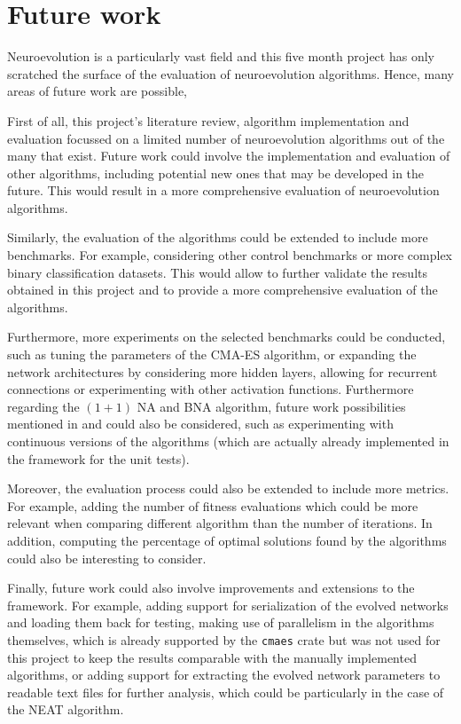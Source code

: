 \chapter{Future work}


Neuroevolution is a particularly vast field and this five month project has only scratched the surface of the evaluation of neuroevolution algorithms. Hence, many areas of future work are possible,

First of all, this project's literature review, algorithm implementation and evaluation focussed on a limited number of neuroevolution algorithms out of the many that exist. Future work could involve
the implementation and evaluation of other algorithms, including potential new ones that may be developed in the future. This would result in a more comprehensive evaluation of neuroevolution algorithms.

Similarly, the evaluation of the algorithms could be extended to include more benchmarks. For example, considering other control benchmarks or more complex binary classification datasets.
This would allow to further validate the results obtained in this project and to provide a more comprehensive evaluation of the algorithms.

Furthermore, more experiments on the selected benchmarks could be conducted, such as tuning the parameters of the CMA-ES algorithm, or expanding the network architectures by considering more
hidden layers, allowing for recurrent connections or experimenting with other activation functions. Furthermore regarding the $(1 + 1)$ NA and BNA algorithm, future work possibilities mentioned
in \cite{na} and \cite{bna} could also be considered, such as experimenting with continuous versions of the algorithms (which are actually already implemented in the framework for the unit tests).

Moreover, the evaluation process could also be extended to include more metrics. For example, adding the number of fitness evaluations which could be more relevant when comparing different algorithm
than the number of iterations. In addition, computing the percentage of optimal solutions found by the algorithms could also be interesting to consider.

Finally, future work could also involve improvements and extensions to the framework. For example, adding support for serialization of the evolved networks and loading them back for testing, making
use of parallelism in the algorithms themselves, which is already supported by the \texttt{cmaes} crate but was not used for this project to keep the results comparable with the manually implemented
algorithms, or adding support for extracting the evolved network parameters to readable text files for further analysis, which could be particularly in the case of the NEAT algorithm.

